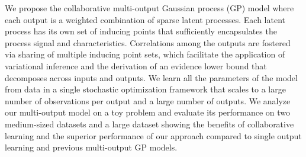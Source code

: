 We propose the collaborative multi-output Gaussian process (GP)  model 
where each output is a weighted combination of sparse latent processes.
 Each latent process has its own set of inducing points that sufficiently encapsulates the process signal and characteristics.
Correlations among the outputs are fostered via sharing of multiple inducing point sets, 
which facilitate  the  application of variational inference and the derivation of 
an evidence lower bound  that decomposes across inputs and outputs. 
We learn all the parameters of the model from data in a  single stochastic optimization framework
that scales to a large number of observations per output and a large number of outputs.
%
We analyze our multi-output model on a toy problem  and evaluate its performance on 
two medium-sized datasets and a large dataset showing the benefits of collaborative learning 
and the superior performance of our approach compared to single output learning and previous 
multi-output GP models.
   
